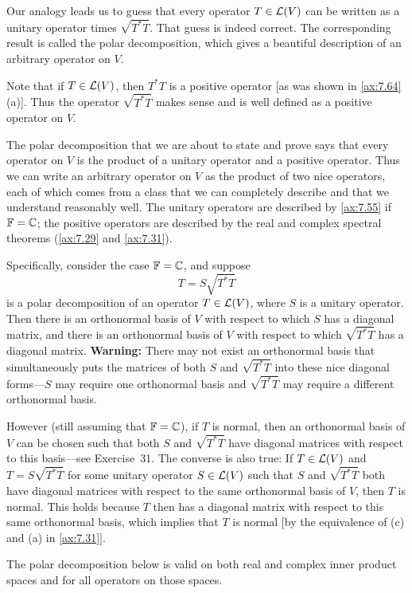 Our analogy leads us to guess that every operator $T\in\mathcal{L}(V)$ can be written
as a unitary operator times $\sqrt{T^*T}$. That guess is indeed correct. The
corresponding result is called the polar decomposition, which gives a
beautiful description of an arbitrary operator on $V$.

Note that if $T\in\mathcal{L}(V)$, then $T^*T$ is a positive operator [as was shown
in \ref{ax:7.64}(a)]. Thus the operator $\sqrt{T^*T}$ makes sense and is well
defined as a positive operator on $V$.

The polar decomposition that we are about to state and prove says that every
operator on $V$ is the product of a unitary operator and a positive operator.
Thus we can write an arbitrary operator on $V$ as the product of two nice
operators, each of which comes from a class that we can completely describe
and that we understand reasonably well. The unitary operators are described by
\ref{ax:7.55} if $\mathbb{F}=\mathbb{C}$; the positive operators are described by the real and
complex spectral theorems (\ref{ax:7.29} and \ref{ax:7.31}).

Specifically, consider the case $\mathbb{F}=\mathbb{C}$, and suppose
\[ T=S\sqrt{T^*T} \]
is a polar decomposition of an operator $T\in\mathcal{L}(V)$, where $S$ is a unitary
operator. Then there is an orthonormal basis of $V$ with respect to which $S$
has a diagonal matrix, and there is an orthonormal basis of $V$ with respect
to which $\sqrt{T^*T}$ has a diagonal matrix. \textbf{Warning:} There may not
exist an orthonormal basis that simultaneously puts the matrices of both $S$
and $\sqrt{T^*T}$ into these nice diagonal forms---$S$ may require one
orthonormal basis and $\sqrt{T^*T}$ may require a different orthonormal basis.

However (still assuming that $\mathbb{F}=\mathbb{C}$), if $T$ is normal, then an orthonormal
basis of $V$ can be chosen such that both $S$ and $\sqrt{T^*T}$ have diagonal
matrices with respect to this basis---see Exercise~31. The converse is also
true: If $T\in\mathcal{L}(V)$ and $T=S\sqrt{T^*T}$ for some unitary operator
$S\in\mathcal{L}(V)$ such that $S$ and $\sqrt{T^*T}$ both have diagonal matrices with
respect to the same orthonormal basis of $V$, then $T$ is normal. This holds
because $T$ then has a diagonal matrix with respect to this same orthonormal
basis, which implies that $T$ is normal [by the equivalence of (c) and (a) in
\ref{ax:7.31}].

The polar decomposition below is valid on both real and complex inner product
spaces and for all operators on those spaces.

